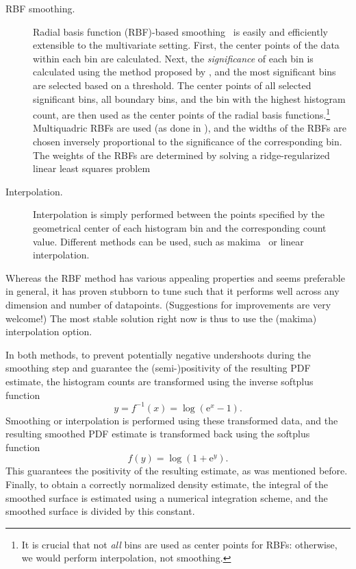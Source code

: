 \documentclass{scrarticle}
\newcommand*{\e}{\mathrm{e}}
\begin{document}
	\begin{description}
	\item [RBF smoothing.] Radial basis function (RBF)-based smoothing~\cite{Fasshauer2007a} is easily and efficiently extensible to the multivariate setting.
	First, the center points of the data within each bin are calculated.
	Next, the \emph{significance} of each bin is calculated using the method proposed by \textcite{Allison1993}, and the most significant bins are selected based on a threshold.
	The center points of all selected significant bins, all boundary bins, and the bin with the highest histogram count, are then used as the center points of the radial basis functions.\footnote{It is crucial that not \emph{all} bins are used as center points for RBFs: otherwise, we would perform interpolation, not smoothing.}
	Multiquadric RBFs are used (as done in \textcite{Allison1993}), and the widths of the RBFs are chosen inversely proportional to the significance of the corresponding bin.
	The weights of the RBFs are determined by solving a ridge-regularized linear least squares problem~\cite{Fasshauer2007a}
	\item[Interpolation.] Interpolation is simply performed between the points specified by the geometrical center of each histogram bin and the corresponding count value. Different methods can be used, such as makima~\cite{Ionita2019} or linear interpolation.
	\end{description}
	Whereas the RBF method has various appealing properties and seems preferable in general, it has proven stubborn to tune such that it performs well across any dimension and number of datapoints. (Suggestions for improvements are very welcome!)
	The most stable solution right now is thus to use the (makima) interpolation option.
	
	In both methods, to prevent potentially negative undershoots during the smoothing step and guarantee the (semi-)positivity of the resulting PDF estimate, the histogram counts are transformed using the inverse softplus function~\cite{Dugas2001}
	\begin{equation*}
		y=f^{-1}(x) = \log (\e^x-1).
	\end{equation*}
	Smoothing or interpolation is performed using these transformed data, and the resulting smoothed PDF estimate is transformed back using the softplus function~\cite{Dugas2001}
	\begin{equation*}
		f(y) = \log (1 + \e^y).
	\end{equation*}
	This guarantees the positivity of the resulting estimate, as was mentioned before.
	Finally, to obtain a correctly normalized density estimate, the integral of the smoothed surface is estimated using a numerical integration scheme, and the smoothed surface is divided by this constant.

	\printbibliography
\end{document}
